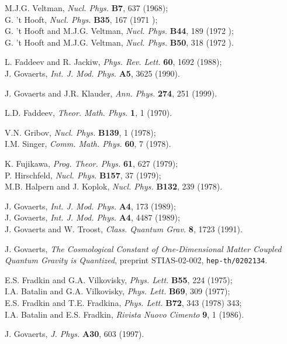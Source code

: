 \documentclass[a4paper,11pt]{article}
\begin{document}
\begin{thebibliography}{99}
M.J.G. Veltman, {\em Nucl. Phys.\/} {\bf B7}, 637 (1968);\\
G. 't Hooft, {\em Nucl. Phys.\/} {\bf B35}, 167 (1971 );\\
G. 't Hooft and M.J.G. Veltman, {\em Nucl. Phys.\/} {\bf B44}, 189 (1972 );\\
G. 't Hooft and M.J.G. Veltman, {\em Nucl. Phys.\/} {\bf B50}, 318 (1972 ).

 L. Faddeev and R. Jackiw, {\em Phys. Rev. Lett.\/} {\bf 60}, 
1692 (1988);\\
J. Govaerts, {\em Int. J. Mod. Phys.\/} {\bf A5}, 3625 (1990).

J. Govaerts and J.R. Klauder, {\em Ann. Phys.\/} {\bf 274}, 251 (1999).

 L.D. Faddeev, {\em Theor. Math. Phys.\/} {\bf 1}, 1 (1970).

V.N. Gribov, {\em Nucl. Phys.\/} {\bf B139}, 1 (1978);\\
I.M. Singer, {\em Comm. Math. Phys.\/} {\bf 60}, 7 (1978).

K. Fujikawa, {\em Prog. Theor. Phys.\/} {\bf 61}, 627 (1979);\\
P. Hirschfeld, {\em Nucl. Phys.\/} {\bf B157}, 37 (1979);\\
M.B. Halpern and J. Koplok, {\sl Nucl. Phys.\/} {\bf B132}, 239 (1978).

J. Govaerts, {\em Int. J. Mod. Phys.} {\bf A4}, 173 (1989);\\
J. Govaerts, {\em Int. J. Mod. Phys.} {\bf A4}, 4487 (1989);\\
J. Govaerts and W. Troost, {\em Class. Quantum Grav.} {\bf 8}, 1723 (1991).

 J. Govaerts, {\sl The Cosmological Constant of One-Dimensional 
Matter Coupled Quantum Gravity is Quantized\/}, 
preprint STIAS-02-002, {\tt hep-th/0202134}.

E.S. Fradkin and G.A. Vilkovisky, {\em Phys. Lett.\/} {\bf B55}, 224 (1975);\\
I.A. Batalin and G.A. Vilkovisky, {\em Phys. Lett.\/} {\bf B69}, 309 (1977);\\
E.S. Fradkin and T.E. Fradkina, {\sl Phys. Lett.\/} {\bf B72}, 343 (1978) 343;\\
I.A. Batalin and E.S. Fradkin, {\sl Rivista Nuovo Cimento\/} {\bf 9}, 1 (1986).

 J. Govaerts, {\em J. Phys.\/} {\bf A30}, 603 (1997).


\end{thebibliography}
\end{document}
